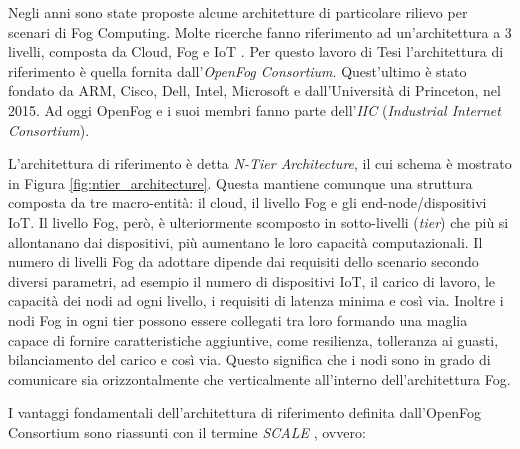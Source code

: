 Negli anni sono state proposte alcune architetture di particolare rilievo per scenari di Fog Computing. Molte ricerche fanno riferimento ad un'architettura a 3 livelli, composta da Cloud, Fog e IoT \cite{ThreeLevelArchitecture}. Per questo lavoro di Tesi l'architettura di riferimento è quella fornita dall'\textit{OpenFog Consortium}. Quest'ultimo è stato fondato da ARM, Cisco, Dell, Intel, Microsoft e dall'Università di Princeton, nel 2015. Ad oggi OpenFog e i suoi membri fanno parte dell'\textit{IIC} (\textit{Industrial Internet Consortium}). 

L'architettura di riferimento è detta \textit{N-Tier Architecture}, il cui schema è mostrato in Figura \ref{fig:ntier_architecture}. Questa mantiene comunque una struttura composta da tre macro-entità: il cloud, il livello Fog e gli end-node/dispositivi IoT. Il livello Fog, però, è ulteriormente scomposto in sotto-livelli (\textit{tier}) che più si allontanano dai dispositivi, più aumentano le loro capacità computazionali. Il numero di livelli Fog da adottare dipende dai requisiti dello scenario secondo diversi parametri, ad esempio il numero di dispositivi IoT, il carico di lavoro, le capacità dei nodi ad ogni livello, i requisiti di latenza minima e così via. Inoltre i nodi Fog in ogni tier possono essere collegati tra loro formando una maglia capace di fornire caratteristiche aggiuntive, come resilienza, tolleranza ai guasti, bilanciamento del carico e così via. Questo significa che i nodi sono in grado di comunicare sia orizzontalmente che verticalmente all'interno dell'architettura Fog.

I vantaggi fondamentali dell'architettura di riferimento definita dall'OpenFog Consortium sono riassunti con il termine \textit{SCALE} \cite{OpenFogReferenceArchitecture}, ovvero:

